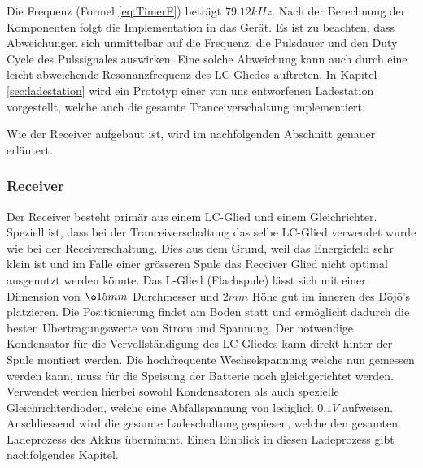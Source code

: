 Die Frequenz (Formel \ref{eq:TimerF}) beträgt  $79.12kHz$. Nach der Berechnung der Komponenten folgt die Implementation in das Gerät. Es ist zu beachten, dass Abweichungen sich unmittelbar auf die Frequenz, die Pulsdauer und den Duty Cycle des Pulssignales auswirken. Eine solche Abweichung kann auch durch eine leicht abweichende Resonanzfrequenz des LC-Gliedes auftreten. In Kapitel \ref{sec:ladestation} wird ein Prototyp einer von uns entworfenen Ladestation vorgestellt, welche auch die gesamte Tranceiverschaltung implementiert.

Wie der Receiver aufgebaut ist, wird im nachfolgenden Abschnitt genauer erläutert.

\subsubsection*{Receiver}
Der Receiver besteht primär aus einem LC-Glied und einem Gleichrichter. Speziell ist, dass bei der Tranceiverschaltung das selbe LC-Glied verwendet wurde wie bei der Receiverschaltung. Dies aus dem Grund, weil das Energiefeld sehr klein ist und im Falle einer grösseren Spule das Receiver Glied nicht optimal ausgenutzt werden könnte. Das L-Glied (Flachspule) lässt sich mit einer Dimension von $\o 15mm$ Durchmesser und $2mm$ Höhe gut im inneren des Dōjō’s platzieren. Die Positionierung findet am Boden statt und ermöglicht dadurch die besten Übertragungswerte von Strom und Spannung. Der notwendige Kondensator für die Vervollständigung des LC-Gliedes kann direkt hinter der Spule montiert werden. Die hochfrequente Wechselspannung welche nun gemessen werden kann, muss für die Speisung der Batterie noch gleichgerichtet werden. Verwendet werden hierbei sowohl Kondensatoren als auch spezielle Gleichrichterdioden, welche eine Abfallspannung von lediglich $0.1V$ aufweisen. Anschliessend wird die gesamte Ladeschaltung gespiesen, welche den gesamten Ladeprozess des Akkus übernimmt. Einen Einblick in diesen Ladeprozess gibt nachfolgendes Kapitel.
